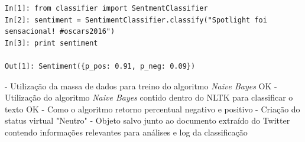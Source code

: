 \begin{lstlisting}[style=python, frame=single]
In[1]: from classifier import SentmentClassifier
In[2]: sentiment = SentimentClassifier.classify("Spotlight foi sensacional! #oscars2016")
In[3]: print sentiment

Out[1]: Sentiment({p_pos: 0.91, p_neg: 0.09})

\end{lstlisting}


- Utilização da massa de dados para treino do algoritmo \textit{Naive Bayes} OK
- Utilização do algoritmo \textit{Naive Bayes} contido dentro do NLTK para classificar o texto OK
- Como o algoritmo retorno percentual negativo e positivo
- Criação do status virtual "Neutro"
- Objeto salvo junto ao documento extraído do Twitter contendo informações relevantes para análises e log da classificação